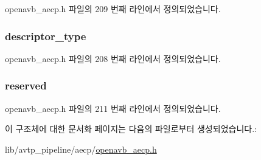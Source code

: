 openavb\+\_\+aecp.\+h 파일의 209 번째 라인에서 정의되었습니다.

\subsubsection[{\texorpdfstring{descriptor\+\_\+type}{descriptor_type}}]{ descriptor\+\_\+type}\hypertarget{structopenavb__aecp__response__data__get__clock__source__t_a1e231d7874aada5925b29affc76782cc}{}\label{structopenavb__aecp__response__data__get__clock__source__t_a1e231d7874aada5925b29affc76782cc}


openavb\+\_\+aecp.\+h 파일의 208 번째 라인에서 정의되었습니다.

\subsubsection[{\texorpdfstring{reserved}{reserved}}]{ reserved}\hypertarget{structopenavb__aecp__response__data__get__clock__source__t_ac15a687d635cc969d1bfab4d96858b77}{}\label{structopenavb__aecp__response__data__get__clock__source__t_ac15a687d635cc969d1bfab4d96858b77}


openavb\+\_\+aecp.\+h 파일의 211 번째 라인에서 정의되었습니다.



이 구조체에 대한 문서화 페이지는 다음의 파일로부터 생성되었습니다.\+:\begin{DoxyCompactItemize}
\item 
lib/avtp\+\_\+pipeline/aecp/\hyperlink{openavb__aecp_8h}{openavb\+\_\+aecp.\+h}\end{DoxyCompactItemize}
